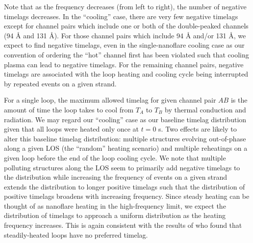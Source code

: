 Note that as the frequency decreases (from left to right), the number of negative timelags decreases. In the ``cooling'' case, there are very few negative timelags except for channel pairs which include one or both of the double-peaked channels (94 \AA{} and 131 \AA{}). For those channel pairs which include 94 \AA{} and/or 131 \AA{}, we expect to find negative timelags, even in the single-nanoflare cooling case as our convention of ordering the ``hot'' channel first has been violated such that cooling plasma can lead to negative timelags. For the remaining channel pairs, negative timelags are associated with the loop heating and cooling cycle being interrupted by repeated events on a given strand. 

For a single loop, the maximum allowed timelag for given channel pair $AB$ is the amount of time the loop takes to cool from $T_A$ to $T_B$ by thermal conduction and radiation. We may regard our ``cooling'' case as our baseline timelag distribution given that all loops were heated only once at $t=0$ s. Two effects are likely to alter this baseline timelag distribution: multiple structures evolving out-of-phase along a given LOS (the ``random'' heating scenario) and multiple reheatings on a given loop before the end of the loop cooling cycle. We note that multiple polluting structures along the LOS seem to primarily add negative timelags to the distribution while increasing the frequency of events on a given strand extends the distribution to longer positive timelags such that the distribution of positive timelags broadens with increasing frequency. Since steady heating can be thought of as nanoflare heating in the high-frequency limit, we expect the distribution of timelags to approach a uniform distribution as the heating frequency increases. This is again consistent with the results of \citet{viall_signatures_2016} who found that steadily-heated loops have no preferred timelag.
